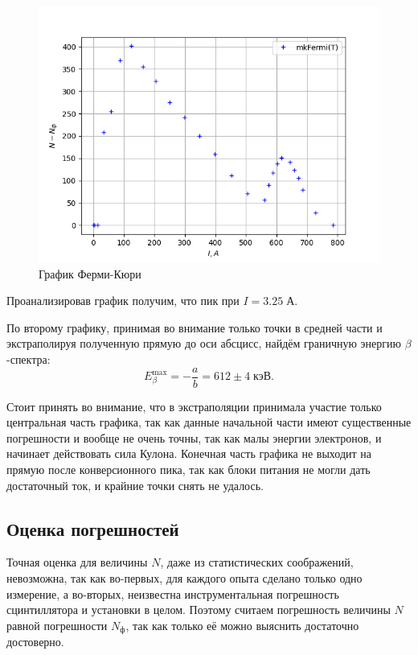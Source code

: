 \documentclass[a4paper, 12pt]{article}%
\newcommand{\btt}{$\beta $}
\begin{document}
	\begin{figure}[!h]
		\centering
		\includegraphics[width=0.9\linewidth]{2.png}
		\caption{График Ферми-Кюри}
		\label{fig:graph2}
	\end{figure}
	
	Проанализировав график получим, что пик при $ I = 3.25\; \text{А} $.
	
	По второму графику, принимая во внимание только точки в средней части и экстраполируя полученную прямую до оси абсцисс, найдём граничную энергию \btt-спектра:
	\[E_\beta^\mathrm{max} = - \dfrac{a}{b} = 612\pm 4 \; \text{кэВ}.\]

	Стоит принять во внимание, что в экстраполяции принимала участие только центральная часть графика, так как данные начальной части имеют существенные погрешности и вообще не очень точны, так как малы энергии электронов, и начинает действовать сила Кулона. Конечная часть графика не выходит на прямую после конверсионного пика, так как блоки питания не могли дать достаточный ток, и крайние точки снять не удалось.
	
	\subsection{Оценка погрешностей}
		
		\label{sec:error}
		
	Точная оценка для величины $ N $, даже из статистических соображений, невозможна, так как во-первых, для каждого опыта сделано только одно измерение, а во-вторых, неизвестна инструментальная погрешность сцинтиллятора и установки в целом. Поэтому считаем погрешность величины $ N $ равной погрешности $ N_{\text{ф}} $, так как только её можно выяснить достаточно достоверно.
		
\end{document}
